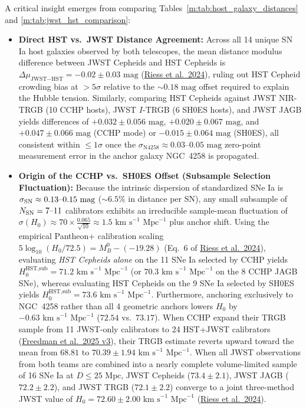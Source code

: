 \documentclass[aps,prd,preprint,superscriptaddress,nofootinbib]{revtex4-2}
\begin{document}
A critical insight emerges from comparing Tables~\ref{m:tab:host_galaxy_distances} and \ref{m:tab:jwst_hst_comparison}:
\begin{itemize}
    \setlength{\itemsep}{3pt}
    \item \textbf{Direct HST vs.\ JWST Distance Agreement:} Across all 14 unique SN Ia host galaxies observed by both telescopes, the mean distance modulus difference between JWST Cepheids and HST Cepheids is $\Delta\mu_{\text{JWST}-\text{HST}} = -0.02 \pm 0.03\text{ mag}$ (\href{https://arxiv.org/abs/2408.11770}{Riess et al.\ 2024}), ruling out HST Cepheid crowding bias at $>5\sigma$ relative to the $\sim 0.18\text{ mag}$ offset required to explain the Hubble tension. Similarly, comparing HST Cepheids against JWST NIR-TRGB (10 CCHP hosts), JWST $I$-TRGB (6 SH0ES hosts), and JWST JAGB yields differences of $+0.032 \pm 0.056\text{ mag}$, $+0.020 \pm 0.067\text{ mag}$, and $+0.047 \pm 0.066\text{ mag}$ (CCHP mode) or $-0.015 \pm 0.064\text{ mag}$ (SH0ES), all consistent within $\le 1\sigma$ once the $\sigma_{\text{N4258}} \approx 0.03\text{--}0.05\text{ mag}$ zero-point measurement error in the anchor galaxy NGC~4258 is propagated.
    \item \textbf{Origin of the CCHP vs.\ SH0ES Offset (Subsample Selection Fluctuation):} Because the intrinsic dispersion of standardized SNe Ia is $\sigma_{\rm SN} \approx 0.13\text{--}0.15\text{ mag}$ ($\sim 6.5\%$ in distance per SN), any small subsample of $N_{\rm SN} = 7\text{--}11$ calibrators exhibits an irreducible sample-mean fluctuation of $\sigma(H_0) \approx 70 \times \frac{0.065}{\sqrt{10}} \approx 1.5\text{ km s}^{-1}\text{ Mpc}^{-1}$ plus anchor shift. Using the empirical Pantheon+ calibration scaling $5\log_{10}(H_0/72.5) = M_B^0 - (-19.28)$ (Eq.~6 of \href{https://arxiv.org/abs/2408.11770}{Riess et al.\ 2024}), evaluating \emph{HST Cepheids alone} on the 11 SNe Ia selected by CCHP yields $H_0^{\text{HST,sub}} = 71.2\text{ km s}^{-1}\text{ Mpc}^{-1}$ (or $70.3\text{ km s}^{-1}\text{ Mpc}^{-1}$ on the 8 CCHP JAGB SNe), whereas evaluating HST Cepheids on the 9 SNe Ia selected by SH0ES yields $H_0^{\text{HST,sub}} = 73.6\text{ km s}^{-1}\text{ Mpc}^{-1}$. Furthermore, anchoring exclusively to NGC~4258 rather than all 4 geometric anchors lowers $H_0$ by $-0.63\text{ km s}^{-1}\text{ Mpc}^{-1}$ ($72.54$ vs.\ $73.17$). When CCHP expand their TRGB sample from 11 JWST-only calibrators to 24 HST+JWST calibrators (\href{https://arxiv.org/abs/2408.06153}{Freedman et al.\ 2025 v3}), their TRGB estimate reverts upward toward the mean from $68.81$ to $70.39 \pm 1.94\text{ km s}^{-1}\text{ Mpc}^{-1}$. When all JWST observations from both teams are combined into a nearly complete volume-limited sample of 16 SNe Ia at $D \le 25\text{ Mpc}$, JWST Cepheids ($73.4 \pm 2.1$), JWST JAGB ($72.2 \pm 2.2$), and JWST TRGB ($72.1 \pm 2.2$) converge to a joint three-method JWST value of $H_0 = 72.60 \pm 2.00\text{ km s}^{-1}\text{ Mpc}^{-1}$ (\href{https://arxiv.org/abs/2408.11770}{Riess et al.\ 2024}).
\end{itemize}
\end{document}
